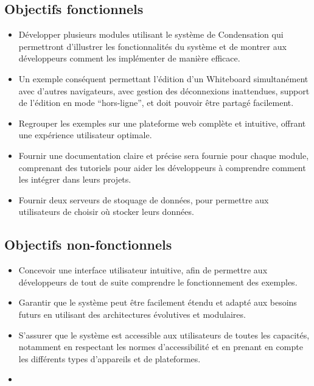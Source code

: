 \subsection*{Objectifs \guillemotleft fonctionnels\guillemotright}

\begin{itemize}
    \item Développer plusieurs modules utilisant le système de Condensation qui permettront d'illustrer les fonctionnalités du système et de montrer aux développeurs comment les implémenter de manière efficace.
    \item Un exemple conséquent permettant l’édition d’un Whiteboard simultanément avec d’autres navigateurs, avec gestion des déconnexions inattendues, support de l’édition en mode “hors-ligne”, et doit pouvoir être partagé facilement.
    \item Regrouper les exemples sur une plateforme web complète et intuitive, offrant une expérience utilisateur optimale.
    \item Fournir une documentation claire et précise sera fournie pour chaque module, comprenant des tutoriels pour aider les développeurs à comprendre comment les intégrer dans leurs projets.
    \item Fournir deux serveurs de stoquage de données, pour permettre aux utilisateurs de choisir où stocker leurs données.
\end{itemize}


\subsection*{Objectifs \guillemotleft non-fonctionnels\guillemotright}

\begin{itemize}
    \item Concevoir une interface utilisateur intuitive, afin de permettre aux développeurs de tout de suite comprendre le fonctionnement des exemples.
    \item Garantir que le système peut être facilement étendu et adapté aux besoins futurs en utilisant des architectures évolutives et modulaires.
    \item S'assurer que le système est accessible aux utilisateurs de toutes les capacités, notamment en respectant les normes d'accessibilité et en prenant en compte les différents types d'appareils et de plateformes.
    \item 
\end{itemize}

